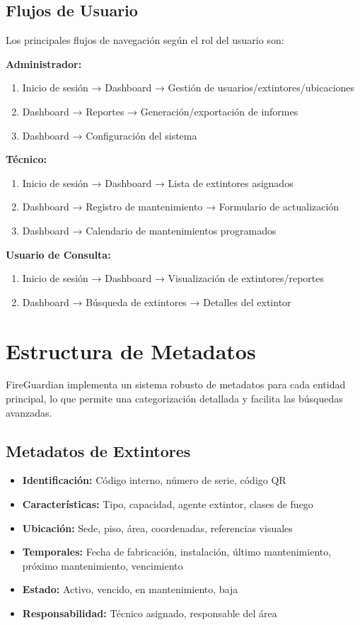 \documentclass[11pt,a4paper]{article}
\begin{document}
\subsection{Flujos de Usuario}

Los principales flujos de navegación según el rol del usuario son:

\textbf{Administrador:}
\begin{enumerate}
    \item Inicio de sesión → Dashboard → Gestión de usuarios/extintores/ubicaciones
    \item Dashboard → Reportes → Generación/exportación de informes
    \item Dashboard → Configuración del sistema
\end{enumerate}

\textbf{Técnico:}
\begin{enumerate}
    \item Inicio de sesión → Dashboard → Lista de extintores asignados
    \item Dashboard → Registro de mantenimiento → Formulario de actualización
    \item Dashboard → Calendario de mantenimientos programados
\end{enumerate}

\textbf{Usuario de Consulta:}
\begin{enumerate}
    \item Inicio de sesión → Dashboard → Visualización de extintores/reportes
    \item Dashboard → Búsqueda de extintores → Detalles del extintor
\end{enumerate}

\section{Estructura de Metadatos}

FireGuardian implementa un sistema robusto de metadatos para cada entidad principal, lo que permite una categorización detallada y facilita las búsquedas avanzadas.

\subsection{Metadatos de Extintores}

\begin{itemize}
    \item \textbf{Identificación:} Código interno, número de serie, código QR
    \item \textbf{Características:} Tipo, capacidad, agente extintor, clases de fuego
    \item \textbf{Ubicación:} Sede, piso, área, coordenadas, referencias visuales
    \item \textbf{Temporales:} Fecha de fabricación, instalación, último mantenimiento, próximo mantenimiento, vencimiento
    \item \textbf{Estado:} Activo, vencido, en mantenimiento, baja
    \item \textbf{Responsabilidad:} Técnico asignado, responsable del área
\end{itemize}
\end{document}
